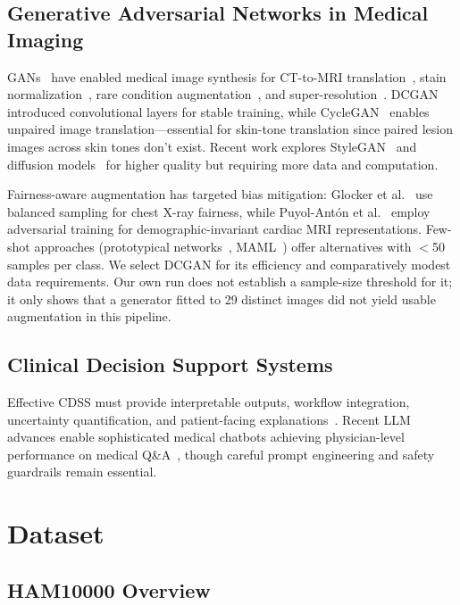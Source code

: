 \documentclass[ai,article,submit,pdftex,moreauthors]{Definitions/mdpi}
\begin{document}
\subsection{Generative Adversarial Networks in Medical Imaging}

GANs~\cite{goodfellow2014} have enabled medical image synthesis for CT-to-MRI translation~\cite{wolterink2017}, stain normalization~\cite{shaban2019}, rare condition augmentation~\cite{frid2018}, and super-resolution~\cite{mahapatra2019}. DCGAN~\cite{radford2015} introduced convolutional layers for stable training, while CycleGAN~\cite{zhu2017} enables unpaired image translation---essential for skin-tone translation since paired lesion images across skin tones don't exist. Recent work explores StyleGAN~\cite{karras2019} and diffusion models~\cite{ho2020} for higher quality but requiring more data and computation.

Fairness-aware augmentation has targeted bias mitigation: Glocker et al.~\cite{glocker2023} use balanced sampling for chest X-ray fairness, while Puyol-Antón et al.~\cite{puyol2021} employ adversarial training for demographic-invariant cardiac MRI representations. Few-shot approaches (prototypical networks~\cite{snell2017}, MAML~\cite{finn2017}) offer alternatives with $<$50 samples per class. We select DCGAN for its efficiency and comparatively modest data requirements. Our own run does not establish a sample-size threshold for it; it only shows that a generator fitted to 29 distinct images did not yield usable augmentation in this pipeline.

\subsection{Clinical Decision Support Systems}

Effective CDSS must provide interpretable outputs, workflow integration, uncertainty quantification, and patient-facing explanations~\cite{sutton2020}. Recent LLM advances enable sophisticated medical chatbots achieving physician-level performance on medical Q\&A~\cite{singhal2023}, though careful prompt engineering and safety guardrails remain essential.

\section{Dataset}

\subsection{HAM10000 Overview}
\end{document}

